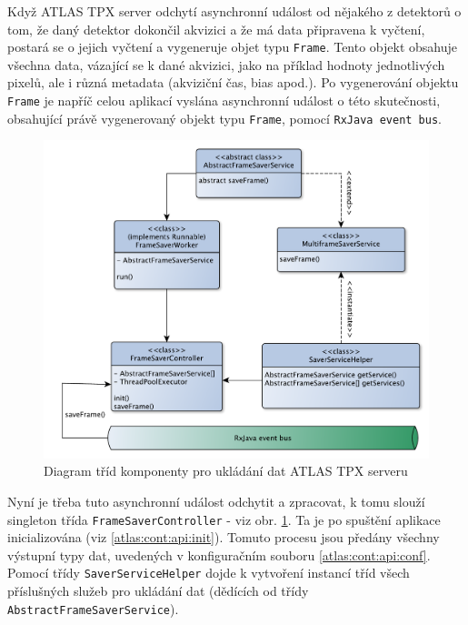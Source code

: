 Když ATLAS TPX server odchytí asynchronní událost od nějakého z detektorů o tom, že daný detektor dokončil akvizici a že má data připravena k vyčtení, postará se o jejich vyčtení a vygeneruje objet typu \texttt{Frame}. Tento objekt obsahuje všechna data, vázající se k dané akvizici, jako na příklad hodnoty jednotlivých pixelů, ale i různá metadata (akviziční čas, bias apod.). Po vygenerování objektu \texttt{Frame} je napříč celou aplikací vyslána asynchronní událost o této skutečnosti, obsahující právě vygenerovaný objekt typu \texttt{Frame}, pomocí \texttt{RxJava event bus}.

\begin{figure}[t]
	\begin{center}
		\includegraphics[width=15cm]{figures/atlas_tpx_saver_service.pdf}
		\caption{Diagram tříd komponenty pro ukládání dat ATLAS TPX serveru}
		\label{fig:atlas:saver-service}
	\end{center}
\end{figure}

Nyní je třeba tuto asynchronní událost odchytit a zpracovat, k tomu slouží singleton třída \texttt{FrameSaverController} - viz obr. \ref{fig:atlas:saver-service}. Ta je po spuštění aplikace inicializována (viz \ref{atlas:cont:api:init}). Tomuto procesu jsou předány všechny výstupní typy dat, uvedených v konfiguračním souboru \ref{atlas:cont:api:conf}. Pomocí třídy \texttt{SaverServiceHelper} dojde k vytvoření instancí tříd všech příslušných služeb pro ukládání dat (dědících od třídy \texttt{AbstractFrameSaverService}).

